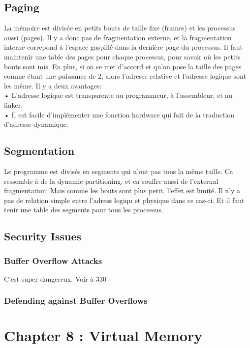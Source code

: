 \subsection{Paging}
La mémoire est divisée en petits bouts de taille fixe (frames) et les processus aussi (pages).
Il y a donc pas de fragmentation externe, et la fragmentation interne correpond à l'espace gaspillé dans la dernière page du processus.
Il faut maintenir une table des pages pour chaque processus, pour savoir où les petits bouts sont mis.
En plus, si on se met d'accord et qu'on pose la taille des pages comme étant une puissance de 2, alors l'adresse relative et l'adresse logique sont les même.
Il y a deux avantages: \\
• L'adresse logique est transparente au programmeur, à l'assembleur, et au linker.
 \\
• Il est facile d'implémenter une fonction hardware qui fait de la traduction d'adresse
dynamique.
\subsection{Segmentation}
Le programme est divisés en segments qui n'ont pas tous la même taille.
Ca ressemble à de la dynamic partitioning, et ca souffre aussi de l'external fragmentation.
Mais comme les bouts sont plus petit, l'effet est limité.
Il n'y a pas de relation simple entre l'adress logiqu et physique dans ce cas-ci.
Et il faut tenir une table des segments pour tous les processus.
\subsection{Security Issues}
\subsubsection{Buffer Overflow Attacks}
C'est super dangereux.
Voir \cite[p.~327]{stallings} à 330
\subsubsection{Defending against Buffer Overflows}

\newpage


\section{Chapter 8 : Virtual Memory}

